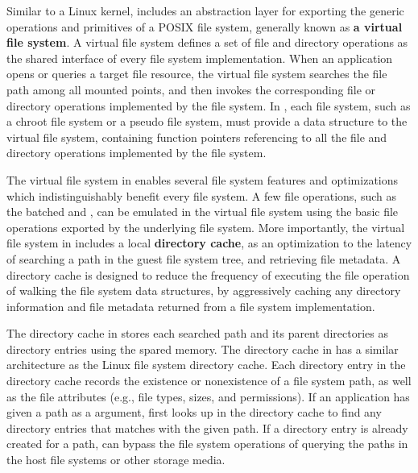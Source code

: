 Similar to a Linux kernel, \thelibos{} includes an abstraction layer for exporting the generic operations and primitives of a POSIX file system,
generally known as {\bf a virtual file system}.
A virtual file system defines a set of file and directory operations as the shared interface of every file system implementation.
When an application opens or queries a target file resource,
the virtual file system
searches the file path among all mounted points,
and then invokes the corresponding file or directory operations implemented by the file system.
In \thelibos{}, each file system, such as a chroot file system
or a pseudo file system,
must provide a data structure to the virtual file system, containing function pointers
referencing to all the file and directory operations  
implemented by the file system.








The virtual file system in \thelibos{} enables several file system features
and optimizations
which indistinguishably benefit every file system.
A few file operations, such as the batched  and ,
can be emulated in the virtual file system
using the basic file operations exported by the underlying file system.
More importantly, 
the virtual file system in \thelibos{} 
includes a local {\bf directory cache},
as an optimization to the latency of searching a path in the guest file system tree,
and retrieving file metadata.
A directory cache
is designed to reduce the frequency
of executing the file operation of walking the file system data structures,
by aggressively caching any directory information
and file metadata
returned from a file system implementation.


The directory cache in \thelibos{} stores each searched path and its parent directories as directory entries
using the spared \picoproc{} memory.
The directory cache in \thelibos{} has a similar architecture
as the Linux file system directory cache.
Each directory entry in the directory cache records the existence or nonexistence of a file system path,
as well as the file attributes
(e.g., file types, sizes, and permissions).
If an application has given a path as a \linuxapi{} argument,
\thelibos{} first looks up
in the directory cache to find any directory entries
that matches with the given path.
If a directory entry is already created for a path, \thelibos{} can bypass the file system operations of querying the paths
in the host file systems or other storage media.


